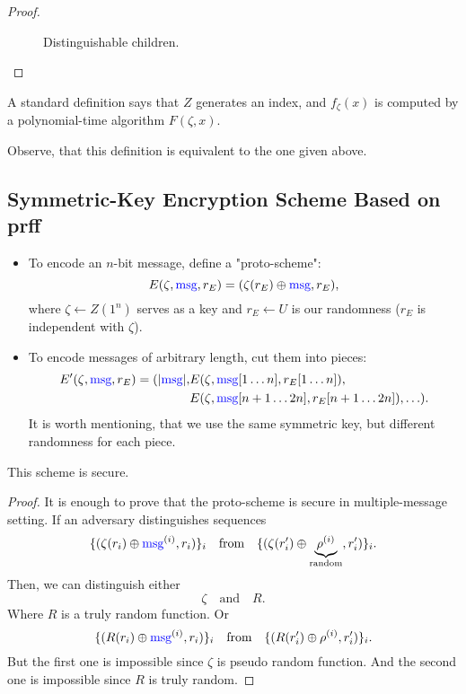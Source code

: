 \begin{proof}
\begin{figure}[htpb]
\begin{tikzpicture}[
  level 1/.style={sibling distance=120mm},
  level 2/.style={sibling distance=60mm},
  level 3/.style={sibling distance=30mm},
  every node/.style={text height=2ex, text depth=.5ex},
  scale=0.8
]
\end{tikzpicture}
		\caption{Distinguishable children.}
		\label{fig:distinguishable_children}
	\end{figure}

\end{proof}
\begin{remark}
A standard definition says that $Z$ generates an index, and  $f_{\zeta}(x)$ is computed by a polynomial-time algorithm $F(\zeta, x)$.
\end{remark}
\begin{exercise}
	Observe, that this definition is equivalent to the one given above.
\end{exercise}

\subsection{Symmetric-Key Encryption Scheme Based on prff}

\begin{itemize}
	\item To encode an $n$-bit message, define a "proto-scheme":
		 \[
		E(\zeta, \m, r_E) = (\zeta(r_E) \oplus \m, r_E)
		,\] 
		where $\zeta \gets Z(1^{n})$ serves as a key and $r_E \gets U$ is our randomness ($r_E$ is independent with $\zeta$).

	\item To encode messages of arbitrary length, cut them into pieces:
		\begin{align*}
			E'(\zeta, \m, r_E) = (|\m|, &E(\zeta, \m[1\ldots n], r_E[1 \ldots n]), \\
										&E(\zeta, \m[n + 1 \ldots 2n], r_E[n + 1 \ldots 2n]), \ldots)
		.\end{align*}
		It is worth mentioning, that we use the same symmetric key, but different randomness for each piece.
\end{itemize}
\begin{lemma}
	This scheme is secure.
\end{lemma}
\begin{proof}
	It is enough to prove that the proto-scheme is secure in multiple-message setting.
	If an adversary distinguishes sequences
	\[
		\{(\zeta(r_i) \oplus \m^{(i)}, r_i)\}_{i} \quad \text{from} \quad \{(\zeta(r_i') \oplus \underbrace{\rho^{(i)}}_{\text{random}}, r_i')\}_{i} 
	.\] 
	Then, we can distinguish either
	\[
		\zeta \quad \text{and} \quad R
	.\] Where $R$ is a truly random function.
	Or
	\[
		\{(R(r_i) \oplus \m^{(i)}, r_i)\}_{i} \quad \text{from} \quad \{(R(r_i') \oplus \rho^{(i)}, r_i')\}_{i} 
	.\] 
	But the first one is impossible since $\zeta$ is pseudo random function.
	And the second one is impossible since $R$ is truly random.
\end{proof}


